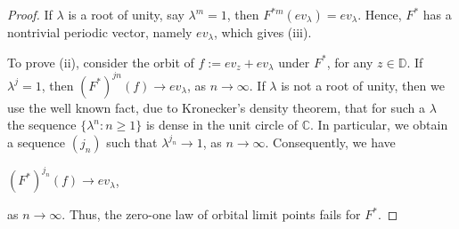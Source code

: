 \documentclass[12pt, reqno]{amsart}
\theoremstyle{definition}
\theoremstyle{remark}
\numberwithin{equation}{section}
\begin{document}
\begin{proof}
 
If $\lambda$ is a root of unity, say $\lambda^m=1$, then $F^{*m}(ev_{\lambda})=ev_{\lambda}$. Hence, $F^{*}$ has a nontrivial periodic vector, namely $ev_{\lambda}$, which gives (iii).

To prove (ii), consider the orbit of $f:=ev_z+ev_{\lambda}$ under $F^*$, for any $z\in \mathbb{D}$. If $\lambda^j=1$, then $(F^*)^{jn}(f)\rightarrow ev_{\lambda}$, as $n\rightarrow \infty$. If $\lambda$ is not a root of unity, then we use the well known fact, due to Kronecker's density theorem, that for such a $\lambda$ the sequence $
\{\lambda^n:n\geq 1\}$ is dense in the unit circle of $\mathbb{C}$. In particular, we obtain a sequence $(j_n)$ such that $\lambda^{j_n}\rightarrow 1$, as $n\rightarrow \infty$. Consequently, we have 
\begin{center}
$(F^*)^{j_n}(f)\rightarrow ev_{\lambda}$,
\end{center}
as $n\rightarrow \infty$.
Thus, the zero-one law of orbital limit points fails for $F^*$.
\end{proof}
\end{document}

